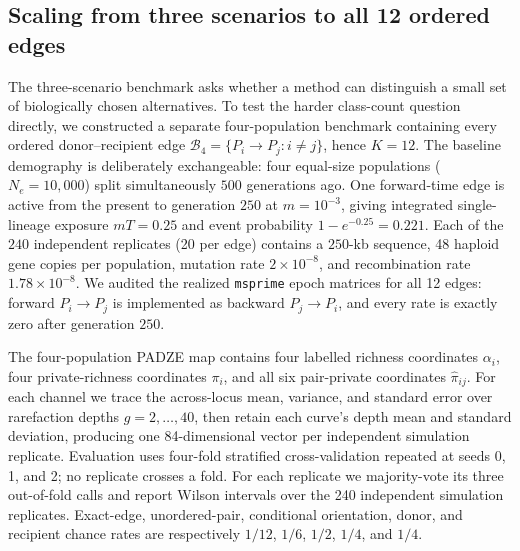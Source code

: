 \documentclass[11pt]{article}
\theoremstyle{plain}
\theoremstyle{definition}
\theoremstyle{remark}
\begin{document}
\subsection{Scaling from three scenarios to all 12 ordered edges}
\label{subsec:twelve-directions}

The three-scenario benchmark asks whether a method can distinguish a small set of biologically
chosen alternatives. To test the harder class-count question directly, we constructed a separate
four-population benchmark containing every ordered donor--recipient edge
$\mathcal B_4=\{P_i\!\to P_j:i\ne j\}$, hence $K=12$. The baseline demography is deliberately
exchangeable: four equal-size populations ($N_e=10{,}000$) split simultaneously $500$
generations ago. One forward-time edge is active from the present to generation $250$ at
$m=10^{-3}$, giving integrated single-lineage exposure $mT=0.25$ and event probability
$1-e^{-0.25}=0.221$. Each of the $240$ independent replicates (20 per edge) contains a
$250$-kb sequence, 48 haploid gene copies per population, mutation rate $2\times10^{-8}$, and
recombination rate $1.78\times10^{-8}$. We audited the realized \texttt{msprime} epoch matrices
for all 12 edges: forward $P_i\!\to P_j$ is implemented as backward $P_j\!\to P_i$, and every
rate is exactly zero after generation $250$.

The four-population PADZE map contains four labelled richness coordinates $\alpha_i$, four
private-richness coordinates $\pi_i$, and all six pair-private coordinates
$\widehat\pi_{ij}$. For each channel we trace the across-locus mean, variance, and standard error
over rarefaction depths $g=2,\ldots,40$, then retain each curve's depth mean and standard
deviation, producing one 84-dimensional vector per independent simulation replicate. Evaluation uses
four-fold stratified cross-validation repeated at seeds 0, 1, and 2; no replicate crosses a fold.
For each replicate we majority-vote its three out-of-fold calls and report Wilson intervals over
the 240 independent simulation replicates. Exact-edge, unordered-pair, conditional orientation, donor, and
recipient chance rates are respectively $1/12$, $1/6$, $1/2$, $1/4$, and $1/4$.
\end{document}
